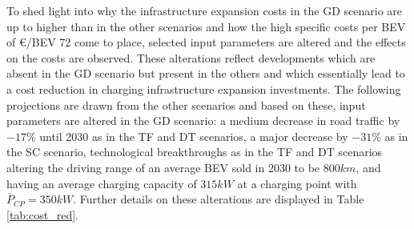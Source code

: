 \documentclass[journal,article,submit,pdftex,moreauthors]{Definitions/mdpi}
\begin{document}
To shed light into why the infrastructure expansion costs in the GD scenario are up to  higher than in the other scenarios and how the high specific costs per BEV of €/BEV 72 come to place,  selected input parameters are altered and the effects on the costs are observed. These alterations reflect developments which are absent in the GD scenario but present in the others and which essentially lead to a cost reduction in charging infrastructure expansion investments. The following projections are drawn from the other scenarios and based on these, input parameters are altered in the GD scenario: a medium decrease in road traffic by $-17\%$ until 2030 as in the TF and DT scenarios, a major decrease by $-31\%$ as in the SC scenario, technological breakthroughs as in the TF and DT scenarios altering the driving range of an average BEV sold in 2030 to be $800km$, and having an average charging capacity of $315kW$ at a charging point with $\overline{P}_{CP} = 350 kW$. Further details on these alterations are displayed in Table \ref{tab:cost_red}. 
\end{document}
